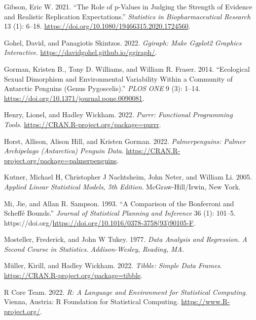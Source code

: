 \documentclass[
]{book}
\newlength{\cslhangindent}
\newlength{\cslentryspacingunit} %
\newenvironment{CSLReferences}[2] %
 {%
  \setlength{\parindent}{0pt}
  \ifodd #1
  \let\oldpar\par
  \def\par{\hangindent=\cslhangindent\oldpar}
  \fi
  \setlength{\parskip}{#2\cslentryspacingunit}
 }%
 {}
\theoremstyle{definition}
\theoremstyle{definition}
\theoremstyle{definition}
\theoremstyle{definition}
\theoremstyle{remark}
\begin{document}
\begin{CSLReferences}{1}{0}
\leavevmode{}%
Gibson, Eric W. 2021. {``The Role of p-Values in Judging the Strength of Evidence and Realistic Replication Expectations.''} \emph{Statistics in Biopharmaceutical Research} 13 (1): 6--18. \url{https://doi.org/10.1080/19466315.2020.1724560}.

\leavevmode{}%
Gohel, David, and Panagiotis Skintzos. 2022. \emph{Ggiraph: Make Ggplot2 Graphics Interactive}. \url{https://davidgohel.github.io/ggiraph/}.

\leavevmode{}%
Gorman, Kristen B., Tony D. Williams, and William R. Fraser. 2014. {``Ecological Sexual Dimorphism and Environmental Variability Within a Community of Antarctic Penguins (Genus Pygoscelis).''} \emph{PLOS ONE} 9 (3): 1--14. \url{https://doi.org/10.1371/journal.pone.0090081}.

\leavevmode{}%
Henry, Lionel, and Hadley Wickham. 2022. \emph{Purrr: Functional Programming Tools}. \url{https://CRAN.R-project.org/package=purrr}.

\leavevmode{}%
Horst, Allison, Alison Hill, and Kristen Gorman. 2022. \emph{Palmerpenguins: Palmer Archipelago (Antarctica) Penguin Data}. \url{https://CRAN.R-project.org/package=palmerpenguins}.

\leavevmode{}%
Kutner, Michael H, Christopher J Nachtsheim, John Neter, and William Li. 2005. \emph{Applied Linear Statistical Models, 5th Edition}. McGraw-Hill/Irwin, New York.

\leavevmode{}%
Mi, Jie, and Allan R. Sampson. 1993. {``A Comparison of the Bonferroni and Scheffé Bounds.''} \emph{Journal of Statistical Planning and Inference} 36 (1): 101--5. https://doi.org/\url{https://doi.org/10.1016/0378-3758(93)90105-F}.

\leavevmode{}%
Mosteller, Frederick, and John W Tukey. 1977. \emph{Data Analysis and Regression. A Second Course in Statistics}. \emph{Addison-Wesley, Reading, MA}.

\leavevmode{}%
Müller, Kirill, and Hadley Wickham. 2022. \emph{Tibble: Simple Data Frames}. \url{https://CRAN.R-project.org/package=tibble}.

\leavevmode{}%
R Core Team. 2022. \emph{R: A Language and Environment for Statistical Computing}. Vienna, Austria: R Foundation for Statistical Computing. \url{https://www.R-project.org/}.


\end{CSLReferences}
\end{document}
